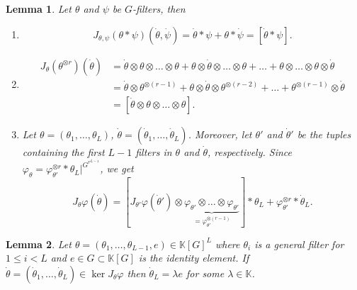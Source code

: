 \documentclass[10pt,a4paper]{amsart}
\newtheorem{lemma}{Lemma}
\newcommand{\K}{\mathbb{K}}
\newcommand{\conv}{\ast}
\newcommand{\kprod}{\otimes}
\begin{document}
\begin{lemma}\label{lemma: jacobian_rules_conv_kprod}
    Let $\theta$ and $\psi$ be $G$-filters, then
    \begin{enumerate}
        \item   
        \[
    J_{\theta , \psi}(\theta \conv \psi)(\dot{\theta}, \dot{\psi}) = \dot{\theta}\conv \psi + \theta\conv \dot{\psi} = [\dot{\theta}\conv \psi].
    \]
    \item
\begin{align*}
        J_{\theta}(\theta^{\otimes r})(\dot{\theta}) &= \dot{\theta}\kprod \theta \kprod\hdots\kprod \theta + \theta \kprod \dot{\theta}  \kprod\hdots\kprod \theta + \hdots + \theta \kprod \hdots \kprod \theta \kprod \dot{\theta}\\
        &= \dot{\theta} \kprod \theta^{\otimes (r-1)} + \theta \kprod \dot{\theta} \kprod \theta^{\otimes (r-2)} + \hdots + \theta^{\otimes (r-1)} \kprod \dot{\theta}\\
        &= [\dot{\theta}\kprod \theta \kprod\hdots\kprod \theta].
\end{align*}

    \item Let $\theta = (\theta_1, \hdots, \theta_L)$, $\dot{\theta} = (\dot{\theta}_1, \hdots, \dot{\theta}_L)$. Moreover, let $\theta'$ and $\dot{\theta}'$ be the tuples containing the first $L-1$ filters in $\theta$ and $\dot{\theta}$, respectively. 
    Since $\varphi_\theta = \varphi_{\theta'}^{\otimes r} \conv \theta_L|^{G^{r^{L-1}}}$, we get
    \[
    J_\theta\varphi(\dot{\theta}) = [J_{\theta'}\varphi(\dot{\theta}') \kprod \underbrace{\varphi_{\theta'} \kprod \hdots \kprod \varphi_{\theta'}}_{= \varphi_{\theta'}^{\otimes (r-1)}}] \conv \theta_L + \varphi_{\theta'}^{\otimes r} \conv \dot{\theta}_L.
    \]
    \end{enumerate}
\end{lemma}

\begin{lemma}\label{lemma: jac_varphi_simplified_case}
    Let $\theta = (\theta_1, \hdots, \theta_{L-1}, e) \in \K[G]^L$ where $\theta_i$ is a general filter for $1\leq i < L$ and $e \in G \subset \K[G]$ is the identity element. If $\dot \theta = (\dot \theta_1, \dots, \dot \theta_L) \in \ker J_\theta \varphi$ then $\dot \theta_L = \lambda e$ for some $\lambda \in \K$.
\end{lemma}
\end{document}
